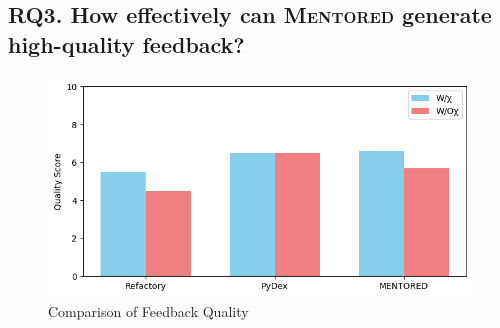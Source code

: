 \documentclass[10pt,conference]{IEEEtran}
\begin{document}
    \subsection{RQ3. How effectively can \textsc{Mentored} generate high-quality feedback?}
        
        \begin{figure}[h]
            \centering
            \includegraphics[width=1.0\linewidth]{quality.png}
            \caption{Comparison of Feedback Quality}
            \label{fig:quality}
        \end{figure}
\end{document}
